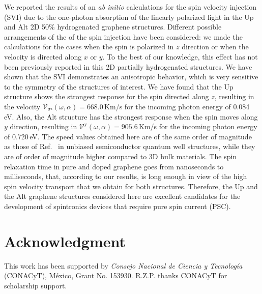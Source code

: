 \documentclass[floatfix,prb,aps,superscriptaddress,showpacs,11pt,preprint,letterpaper]{revtex4}
\begin{document}
We reported the results of an \emph{ab initio} calculations for the spin
velocity injection (SVI) due to the one-photon absorption of the linearly
polarized light in the Up and Alt 2D 50\% hydrogenated graphene structures.
Different possible arrangements of the of the spin injection have been
considered: we made the calculations for the cases when the spin is polarized
in $z$ direction or when the velocity is directed along $x$ or $y$. To the best
of our knowledge, this effect  has not been previously reported in this  2D
partially hydrogenated structures. We have shown that the  SVI demonstrates an
anisotropic behavior, which is very sensitive to the symmetry of the structures
of interest. We have found that the Up structure shows the strongest response
for the spin directed along $z$, resulting in the velocity
$\mathcal{V}_{\sigma^{\mathrm{z}}} (\omega,\alpha) = 668.0$\,Km/s for the
incoming photon energy of 0.084\,eV. Also, the Alt structure has the strongest
response when the spin moves along $y$ direction, resulting in
$\mathcal{V}^{\mathrm{y}} (\omega,\alpha) = 905.6$\,Km/s for the incoming
photon energy of 0.720\,eV. The speed values obtained here are of the same
order of magnitude as those of Ref.~ in unbiased
semiconductor quantum well structures, while they are of order of magnitude
higher compared to 3D bulk materials. The spin relaxation time in pure and
doped graphene goes  from nanoseconds to milliseconds,
\cite{wojtaszekPRB13,ertlerPRB09} that, according to our results, 
is long enough in view of the
high spin velocity transport that we obtain for both
structures. Therefore, the Up and the Alt graphene structures
considered here are  excellent
candidates for the development of spintronics devices that require pure spin
current (PSC).

\section{Acknowledgment}
This work has been supported by \emph{Consejo Nacional de Ciencia y
Tecnolog\'ia} (CONACyT), M\'exico, Grant No. 153930.
R.Z.P. thanks CONACyT for scholarship support.


\end{document}
